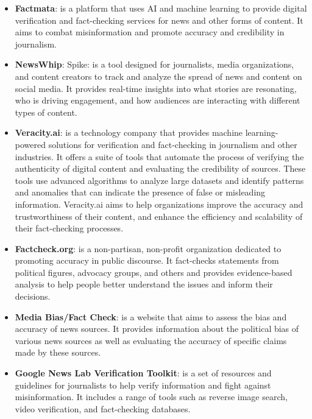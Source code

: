 \documentclass[target=mst,aauheader=]{thud}
\begin{document}
\begin{itemize} 

    \item \textbf{Factmata}\cite{factmata}: is a platform that uses AI and machine learning to provide digital verification and fact-checking services for news and other forms of content. It aims to combat misinformation and promote accuracy and credibility in journalism.
    \item \textbf{NewsWhip}\cite{NewsWhip}: Spike: is a tool designed for journalists, media organizations, and content creators to track and analyze the spread of news and content on social media. It provides real-time insights into what stories are resonating, who is driving engagement, and how audiences are interacting with different types of content.
    \item \textbf{Veracity.ai}\cite{veracityAi}: is a technology company that provides machine learning-powered solutions for verification and fact-checking in journalism and other industries. It offers a suite of tools that automate the process of verifying the authenticity of digital content and evaluating the credibility of sources. These tools use advanced algorithms to analyze large datasets and identify patterns and anomalies that can indicate the presence of false or misleading information. Veracity.ai aims to help organizations improve the accuracy and trustworthiness of their content, and enhance the efficiency and scalability of their fact-checking processes.
    \item \textbf{Factcheck.org}\cite{Factcheck}: is a non-partisan, non-profit organization dedicated to promoting accuracy in public discourse. It fact-checks statements from political figures, advocacy groups, and others and provides evidence-based analysis to help people better understand the issues and inform their decisions.
    \item \textbf{Media Bias/Fact Check}\cite{mediabiasfactcheck}: is a website that aims to assess the bias and accuracy of news sources. It provides information about the political bias of various news sources as well as evaluating the accuracy of specific claims made by these sources.
    \item \textbf{Google News Lab Verification Toolkit}\cite{googleVerificationToolkit}: is a set of resources and guidelines for journalists to help verify information and fight against misinformation. It includes a range of tools such as reverse image search, video verification, and fact-checking databases.

\end{itemize}
\end{document}
